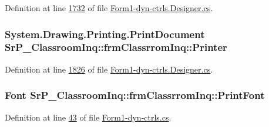 \-Definition at line \hyperlink{_form1-dyn-ctrls_8_designer_8cs_source_l01732}{1732} of file \hyperlink{_form1-dyn-ctrls_8_designer_8cs_source}{\-Form1-\/dyn-\/ctrls.\-Designer.\-cs}.

\hypertarget{class_sr_p___classroom_inq_1_1frm_classrrom_inq_a27d138482c23d40f494f49984816227e}{
\subsubsection[{\-Printer}]{\setlength{\rightskip}{0pt plus 5cm}\-System.\-Drawing.\-Printing.\-Print\-Document {\bf \-Sr\-P\-\_\-\-Classroom\-Inq\-::frm\-Classrrom\-Inq\-::\-Printer}}}
\label{class_sr_p___classroom_inq_1_1frm_classrrom_inq_a27d138482c23d40f494f49984816227e}


\-Definition at line \hyperlink{_form1-dyn-ctrls_8_designer_8cs_source_l01826}{1826} of file \hyperlink{_form1-dyn-ctrls_8_designer_8cs_source}{\-Form1-\/dyn-\/ctrls.\-Designer.\-cs}.

\hypertarget{class_sr_p___classroom_inq_1_1frm_classrrom_inq_a314e4a61ea8458c5198273335dcf0b5f}{
\subsubsection[{\-Print\-Font}]{\setlength{\rightskip}{0pt plus 5cm}\-Font {\bf \-Sr\-P\-\_\-\-Classroom\-Inq\-::frm\-Classrrom\-Inq\-::\-Print\-Font}}}
\label{class_sr_p___classroom_inq_1_1frm_classrrom_inq_a314e4a61ea8458c5198273335dcf0b5f}


\-Definition at line \hyperlink{_form1-dyn-ctrls_8cs_source_l00043}{43} of file \hyperlink{_form1-dyn-ctrls_8cs_source}{\-Form1-\/dyn-\/ctrls.\-cs}.

